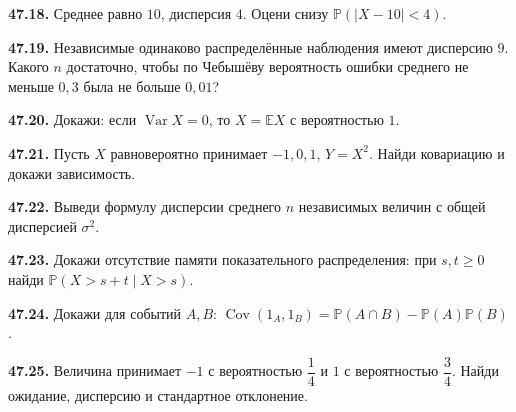 \noindent\begin{minipage}[t]{\linewidth}\textbf{47.18.} Среднее равно \(10\), дисперсия \(4\). Оцени снизу \(\mathbb P(|X-10|<4)\).\par\end{minipage}\par
\noindent\begin{minipage}[t]{\linewidth}\textbf{47.19.} Независимые одинаково распределённые наблюдения имеют дисперсию \(9\). Какого \(n\) достаточно, чтобы по Чебышёву вероятность ошибки среднего не меньше \(0{,}3\) была не больше \(0{,}01\)?\par\end{minipage}\par
\noindent\begin{minipage}[t]{\linewidth}\textbf{47.20.}\starmark{} Докажи: если \(\operatorname{Var}X=0\), то \(X=\mathbb EX\) с вероятностью \(1\).\par\end{minipage}\par
\noindent\begin{minipage}[t]{\linewidth}\textbf{47.21.}\starmark{} Пусть \(X\) равновероятно принимает \(-1,0,1\), \(Y=X^2\). Найди ковариацию и докажи зависимость.\par\end{minipage}\par
\noindent\begin{minipage}[t]{\linewidth}\textbf{47.22.} Выведи формулу дисперсии среднего \(n\) независимых величин с общей дисперсией \(\sigma^2\).\par\end{minipage}\par
\noindent\begin{minipage}[t]{\linewidth}\textbf{47.23.}\starmark{} Докажи отсутствие памяти показательного распределения: при \(s,t\ge0\) найди \(\mathbb P(X>s+t\mid X>s)\).\par\end{minipage}\par
\noindent\begin{minipage}[t]{\linewidth}\textbf{47.24.} Докажи для событий \(A,B\): \(\operatorname{Cov}(1_A,1_B)=\mathbb P(A\cap B)-\mathbb P(A)\mathbb P(B)\).\par\end{minipage}\par
\noindent\begin{minipage}[t]{\linewidth}\textbf{47.25.} Величина принимает \(-1\) с вероятностью \(\dfrac14\) и \(1\) с вероятностью \(\dfrac34\). Найди ожидание, дисперсию и стандартное отклонение.\par\end{minipage}\par
